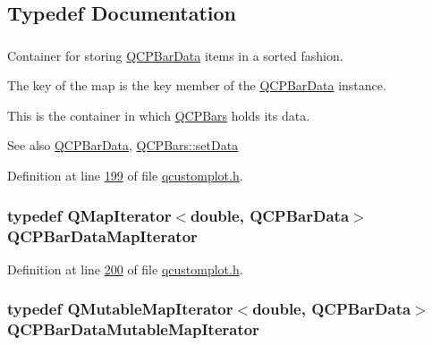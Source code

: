 \subsection{Typedef Documentation}
\hypertarget{a00116_aa846c77472cae93def9f1609d0c57191}{
\subsubsection[{Q\+C\+P\+Bar\+Data\+Map}]{}}\label{a00116_aa846c77472cae93def9f1609d0c57191}


Container for storing \hyperlink{a00026}{Q\+C\+P\+Bar\+Data} items in a sorted fashion. 

The key of the map is the key member of the \hyperlink{a00026}{Q\+C\+P\+Bar\+Data} instance.

This is the container in which \hyperlink{a00027}{Q\+C\+P\+Bars} holds its data. \begin{DoxySeeAlso}{See also}
\hyperlink{a00026}{Q\+C\+P\+Bar\+Data}, \hyperlink{a00027_aa3435aab19e0a49e4e7b41bd36a8d96b}{Q\+C\+P\+Bars\+::set\+Data} 
\end{DoxySeeAlso}


Definition at line \hyperlink{a00116_source_l00199}{199} of file \hyperlink{a00116_source}{qcustomplot.\+h}.

\hypertarget{a00116_ad8f7e19ade25016f69f2ebedbd130f92}{
\subsubsection[{Q\+C\+P\+Bar\+Data\+Map\+Iterator}]{\setlength{\rightskip}{0pt plus 5cm}typedef Q\+Map\+Iterator$<$double, {\bf Q\+C\+P\+Bar\+Data}$>$ {\bf Q\+C\+P\+Bar\+Data\+Map\+Iterator}}}\label{a00116_ad8f7e19ade25016f69f2ebedbd130f92}


Definition at line \hyperlink{a00116_source_l00200}{200} of file \hyperlink{a00116_source}{qcustomplot.\+h}.

\hypertarget{a00116_a5f61a38b8bb85ebfefa76ae0983f1c78}{
\subsubsection[{Q\+C\+P\+Bar\+Data\+Mutable\+Map\+Iterator}]{\setlength{\rightskip}{0pt plus 5cm}typedef Q\+Mutable\+Map\+Iterator$<$double, {\bf Q\+C\+P\+Bar\+Data}$>$ {\bf Q\+C\+P\+Bar\+Data\+Mutable\+Map\+Iterator}}}\label{a00116_a5f61a38b8bb85ebfefa76ae0983f1c78}



